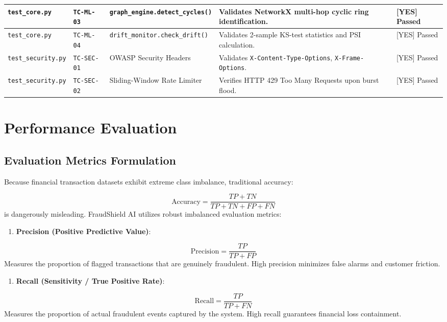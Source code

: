 \documentclass[12pt,a4paper,oneside]{report}
\begin{document}
\begin{table}[H]
\begin{adjustbox}{width=\textwidth,center}
\begin{tabular}{| l | l | l | l | l |}
\texttt{test\_core.py} & \texttt{TC-ML-03} & \texttt{graph\_engine.detect\_cycles()} & Validates NetworkX multi-hop cyclic ring identification. & [YES] Passed \\ \hline
\rowcolor{tablealt} \texttt{test\_core.py} & \texttt{TC-ML-04} & \texttt{drift\_monitor.check\_drift()} & Validates 2-sample KS-test statistics and PSI calculation. & [YES] Passed \\ \hline
\texttt{test\_security.py} & \texttt{TC-SEC-01} & OWASP Security Headers & Validates \texttt{X-Content-Type-Options}, \texttt{X-Frame-Options}. & [YES] Passed \\ \hline
\rowcolor{tablealt} \texttt{test\_security.py} & \texttt{TC-SEC-02} & Sliding-Window Rate Limiter & Verifies HTTP 429 Too Many Requests upon burst flood. & [YES] Passed \\ \hline
\end{tabular}
\end{adjustbox}
\end{table}


\section{Performance Evaluation}

\subsection{Evaluation Metrics Formulation}

Because financial transaction datasets exhibit extreme class imbalance, traditional accuracy:

\begin{equation}
\text{Accuracy} = \frac{TP + TN}{TP + TN + FP + FN}
\end{equation}
is dangerously misleading. FraudShield AI utilizes robust imbalanced evaluation metrics:


\begin{enumerate}[leftmargin=0.35in]
\item \textbf{Precision (Positive Predictive Value)}:
\end{enumerate}
\begin{equation}
\text{Precision} = \frac{TP}{TP + FP}
\end{equation}
Measures the proportion of flagged transactions that are genuinely fraudulent. High precision minimizes false alarms and customer friction.


\begin{enumerate}[leftmargin=0.35in]
\item \textbf{Recall (Sensitivity / True Positive Rate)}:
\end{enumerate}
\begin{equation}
\text{Recall} = \frac{TP}{TP + FN}
\end{equation}
Measures the proportion of actual fraudulent events captured by the system. High recall guarantees financial loss containment.
\end{document}
